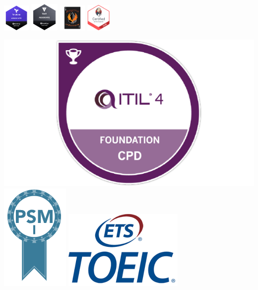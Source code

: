 \documentclass[10pt,a4paper,normalphoto]{altacv}
\begin{document}
\begin{paracol}{2}
\includegraphics[width=0.1\textwidth]{Terraform-Associate-Badge.png}
\includegraphics[width=0.105\textwidth]{vault}
\includegraphics[width=0.1\textwidth]{aceAssociatetBadgeArtboard_1.png}
\includegraphics[width=0.09\textwidth]{jenkins}
\hspace{0,6mm}



\divider


\includegraphics[width=0.16 \textwidth]{itil} \includegraphics[width=0.06 \textwidth]{psm}
\hspace{5mm}\includegraphics[width=0.12 \textwidth]{toeic}

\divider\\




\divider

\divider


\medskip


\end{paracol}
\end{document}
